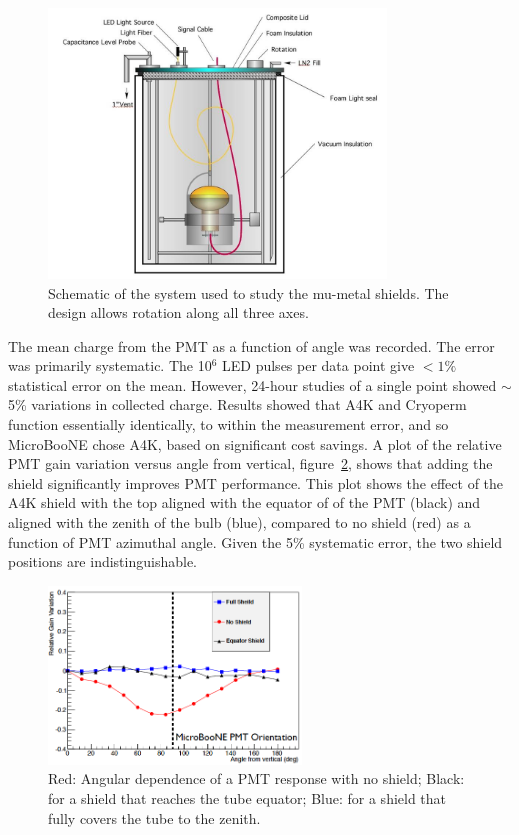 \begin{figure}
\centering 
\includegraphics[width=0.8\textwidth]{./figures/KendzioraRotator.jpg}
\caption{Schematic of the system used to study the mu-metal shields.  The design allows rotation along all three axes. \label{fig:shieldcartoon}  }
\end{figure}


The mean charge from the PMT as a function of angle was recorded.  The error was primarily systematic.   The 10$^6$ LED pulses per data point give $<1\%$ statistical error on the mean.  However, 24-hour studies of a single point showed $\sim$5\% variations in collected charge.  Results showed that A4K and Cryoperm function essentially identically, to within the measurement error, and so MicroBooNE chose A4K, based on significant cost savings.    A plot of the relative PMT gain variation versus angle from vertical, figure~\ref{fig:shield}, shows that adding the shield significantly improves PMT performance.  This plot shows the effect of the A4K shield with the top aligned with the equator of of the PMT (black) and aligned with the zenith of the bulb (blue), compared to no shield (red) as a function of PMT azimuthal angle.  Given the 5\% systematic error, the two shield positions are indistinguishable.  

\begin{figure}
\centering 
\includegraphics[width=0.6\textwidth]{./figures/shield.png}
\caption{Red:  Angular dependence of a PMT response with no shield;  Black:  for a shield that reaches the tube equator;  Blue: for a shield that fully covers the tube to the zenith. \label{fig:shield}  }
\end{figure}



